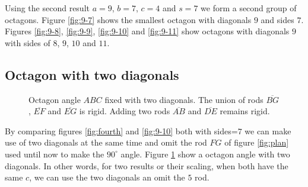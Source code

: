 \documentclass[11pt]{article}
\begin{document}
Using the second result $a=9$, $b=7$, $c=4$ and $s=7$ we form a second group
of octagons. Figure \ref{fig:9-7} shows the smallest octagon with diagonals $9$
and sides $7$. Figures \ref{fig:9-8}, \ref{fig:9-9}, \ref{fig:9-10} and \ref{fig:9-11} show octagons with diagonals $9$ with sides of $8$, $9$, $10$ and $11$.

\subsection{Octagon with two diagonals}

\begin{figure}
\centering
{}
\caption{Octagon angle $ABC$ fixed with two diagonals.
The union of rods $\overline{BG}$, $\overline{EF}$ and $\overline{EG}$ is rigid.
Adding two rods $\overline{AB}$ and $\overline{DE}$ remains rigid.}
\vspace{128in} %
\label{fig:diags2}
\end{figure}

By comparing figures \ref{fig:fourth} and \ref{fig:9-10} both with sides=$7$ we can 
make use of two diagonals at the same time and omit the rod $FG$ of figure \ref{fig:plan} used until now to make the $90^\circ{}$ angle. Figure \ref{fig:diags2} show a
octagon angle with two diagonals. In other words, for two results or their scaling,
when both have the same $c$, we can use the two diagonals an omit the $5$ rod.
\end{document}
